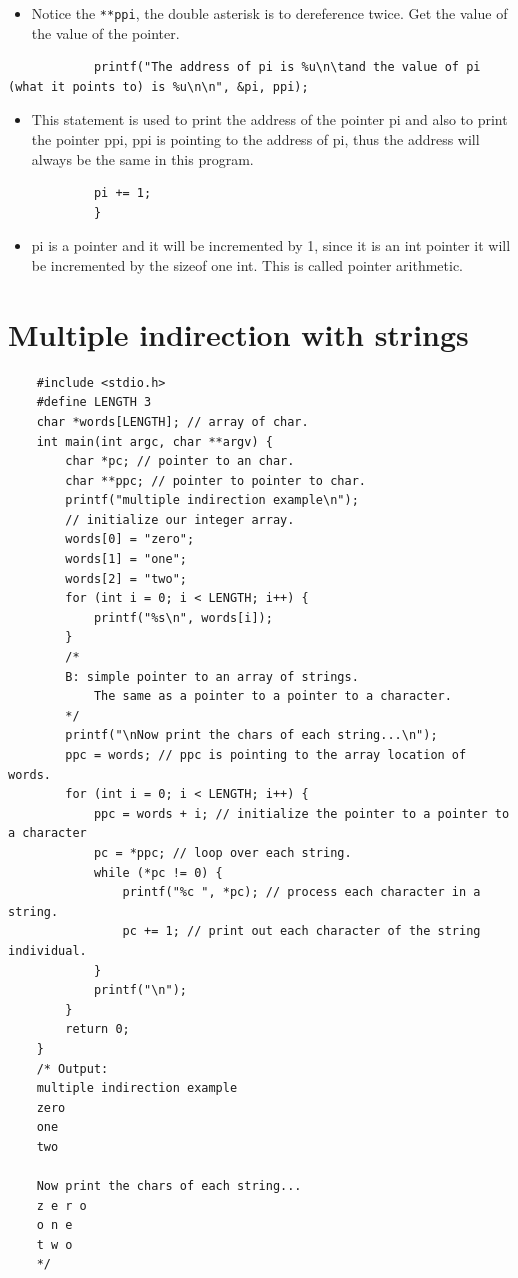 \begin{itemize}
\begin{itemize}
            \item Notice the \texttt{**ppi}, the double asterisk is to dereference twice. Get the value of the value of the pointer.
        \end{itemize}
        \begin{verbatim}
            printf("The address of pi is %u\n\tand the value of pi (what it points to) is %u\n\n", &pi, ppi);
        \end{verbatim}
        \begin{itemize}
            \item This statement is used to print the address of the pointer pi and also to print the pointer ppi, ppi is pointing to the address of pi, thus the address will always be the same in this program.
        \end{itemize}
        \begin{verbatim}
            pi += 1;
            }
        \end{verbatim}
        \begin{itemize}
            \item pi is a pointer and it will be incremented by 1, since it is an int pointer it will be incremented by the sizeof one int. This is called pointer arithmetic.
        \end{itemize}
\end{itemize}

\section{Multiple indirection with strings}
\begin{verbatim}
    #include <stdio.h>
    #define LENGTH 3
    char *words[LENGTH]; // array of char.
    int main(int argc, char **argv) {
        char *pc; // pointer to an char.
        char **ppc; // pointer to pointer to char.
        printf("multiple indirection example\n");
        // initialize our integer array.
        words[0] = "zero";
        words[1] = "one";
        words[2] = "two";
        for (int i = 0; i < LENGTH; i++) {
            printf("%s\n", words[i]);
        }
        /*
        B: simple pointer to an array of strings.
            The same as a pointer to a pointer to a character.
        */
        printf("\nNow print the chars of each string...\n");
        ppc = words; // ppc is pointing to the array location of words.
        for (int i = 0; i < LENGTH; i++) {
            ppc = words + i; // initialize the pointer to a pointer to a character
            pc = *ppc; // loop over each string.
            while (*pc != 0) {
                printf("%c ", *pc); // process each character in a string.
                pc += 1; // print out each character of the string individual.
            }
            printf("\n");
        }
        return 0;
    }
    /* Output:
    multiple indirection example
    zero
    one
    two

    Now print the chars of each string...
    z e r o
    o n e
    t w o
    */
\end{verbatim}

